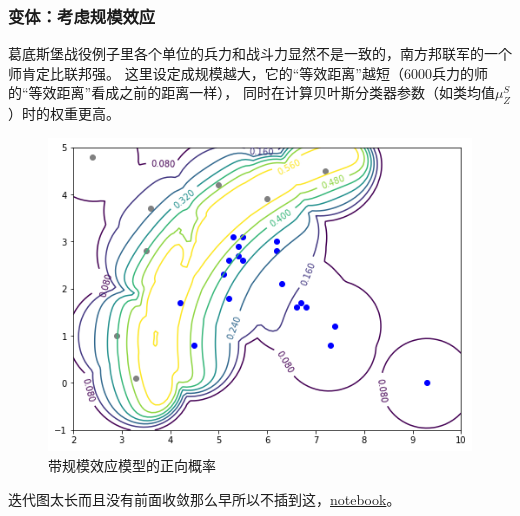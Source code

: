 \documentclass{beamer}
\begin{document}
\begin{frame}

\frametitle{变体：考虑规模效应}

葛底斯堡战役例子里各个单位的兵力和战斗力显然不是一致的，南方邦联军的一个师肯定比联邦强。
这里设定成规模越大，它的“等效距离”越短（6000兵力的师的“等效距离”看成之前的距离一样），
同时在计算贝叶斯分类器参数（如类均值$\mu^S_Z$）时的权重更高。



\begin{figure}[htb]
  \centering
  \includegraphics[width=0.3\linewidth]{gettysburg-forward.png}
  \caption{带规模效应模型的正向概率}
\end{figure}

迭代图太长而且没有前面收敛那么早所以不插到这，\href{gettysburg2.html}{notebook}。

\end{frame}
\end{document}
